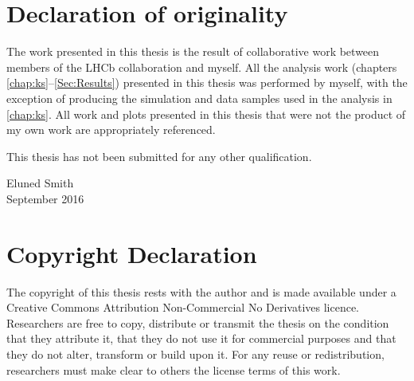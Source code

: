 \chapter*{Declaration of originality}
The work presented in this thesis is the result of collaborative work between members of the LHCb collaboration and myself. All the analysis work (chapters \ref{chap:ks}--\ref{Sec:Results}) presented in this thesis was performed by myself, with the exception of producing the  simulation and data samples used in the analysis in \autoref{chap:ks}. All work and plots presented in this thesis that were not the product of my own work are appropriately referenced. %

\vspace{1cm}
This thesis has not been submitted for any other qualification.

\vspace{1cm}



Eluned Smith \\\vspace{1cm}September 2016


\vspace{5cm}

\clearpage
{}
{}
\chapter*{Copyright Declaration}
The copyright of this thesis rests with the author and is made available under a Creative Commons Attribution Non-Commercial No Derivatives licence. Researchers are free to copy, distribute or transmit the thesis on the condition that they attribute it, that they do not use it for commercial purposes and that they do not alter, transform or build upon it. For any reuse or redistribution, researchers must make clear to others the license terms of this work.
